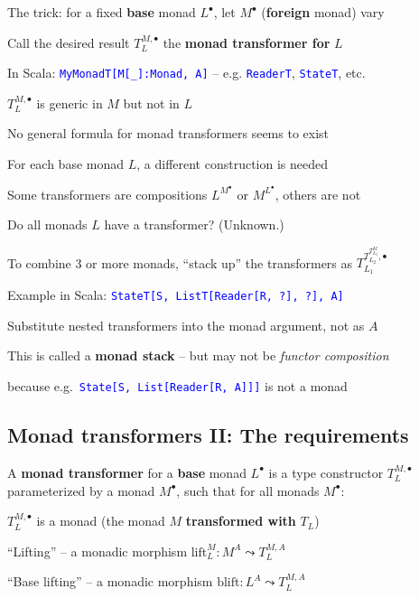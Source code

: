 The trick: for a fixed \textbf{base }monad $L^{\bullet}$, let $M^{\bullet}$
(\textbf{foreign }monad) vary

Call the desired result $T_{L}^{M,\bullet}$ the \textbf{monad transformer
for} $L$

In Scala: \texttt{\textcolor{blue}{\footnotesize{}MyMonadT{[}M{[}\_{]}:Monad,
A{]}}} – e.g. \texttt{\textcolor{blue}{\footnotesize{}ReaderT}}, \texttt{\textcolor{blue}{\footnotesize{}StateT}},
etc.

$T_{L}^{M,\bullet}$ is generic in $M$ but not in $L$

No general formula for monad transformers seems to exist

For each base monad $L$, a different construction is needed

Some transformers are compositions $L^{M^{\bullet}}$ or $M^{L^{\bullet}}$,
others are not

Do all monads $L$ have a transformer? (Unknown.)

{\footnotesize{}\vspace{-0.3cm}}To combine 3 or more monads, ``stack
up'' the transformers as $T_{L_{1}}^{T_{L_{2}}^{T_{L_{3}}^{M}},\bullet}$

Example in Scala: \texttt{\textcolor{blue}{\footnotesize{}StateT{[}S,
ListT{[}Reader{[}R, ?{]}, ?{]}, A{]}}} 

Substitute nested transformers into the monad argument, not as $A$

This is called a \textbf{monad stack} – but may not be \emph{functor
composition}

because e.g.~\texttt{\textcolor{blue}{\footnotesize{}State{[}S, List{[}Reader{[}R,
A{]}{]}{]}}} is not a monad


\subsection{Monad transformers II: The requirements}

{\footnotesize{}\vspace{-0.2cm}}A \textbf{monad transformer} for
a \textbf{base} monad $L^{\bullet}$ is a type constructor $T_{L}^{M,\bullet}$
parameterized by a monad $M^{\bullet}$, such that for all monads
$M^{\bullet}$:

$T_{L}^{M,\bullet}$ is a monad (the monad $M$ \textbf{transformed
with} $T_{L}$)

``Lifting'' – a monadic morphism $\text{lift}_{L}^{M}:M^{A}\leadsto T_{L}^{M,A}$

``Base lifting'' – a monadic morphism $\text{blift}:L^{A}\leadsto T_{L}^{M,A}$

